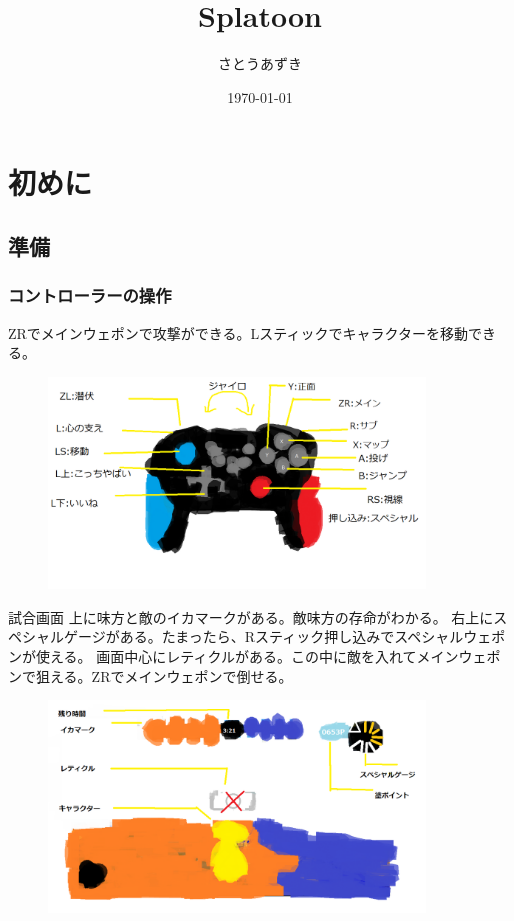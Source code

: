 \documentclass[a4paper,11pt]{jsbook}
\begin{document}
\title{Splatoon}
\author{さとうあずき}
\date{\today}
\maketitle
\tableofcontents

\part{初めに}
\chapter{準備}
\section{コントローラーの操作}
ZRでメインウェポンで攻撃ができる。Lスティックでキャラクターを移動できる。
\begin{figure}
  \begin{center}
    \includegraphics[width=10cm]{resoource/Controller_button.png}
  \end{center}
\end{figure}

試合画面
上に味方と敵のイカマークがある。敵味方の存命がわかる。
右上にスペシャルゲージがある。たまったら、Rスティック押し込みでスペシャルウェポンが使える。
画面中心にレティクルがある。この中に敵を入れてメインウェポンで狙える。ZRでメインウェポンで倒せる。
\begin{figure}
  \begin{center}
    \includegraphics[width=10cm]{resoource/gamescreenframe.png}
  \end{center}
\end{figure}
\end{document}
